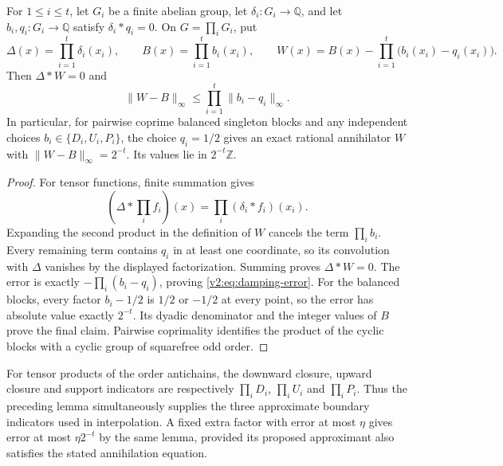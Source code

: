 \begin{lemma}\label{v2:lem:tensor-damping}
For $1\le i\le t$, let $G_i$ be a finite abelian group, let
$\delta_i:G_i\to\mathbb Q$, and let $b_i,q_i:G_i\to\mathbb Q$ satisfy
$\delta_i*q_i=0$.  On $G=\prod_iG_i$, put
\[
 \Delta(x)=\prod_{i=1}^t\delta_i(x_i),\qquad
 B(x)=\prod_{i=1}^tb_i(x_i),\qquad
 W(x)=B(x)-\prod_{i=1}^t\bigl(b_i(x_i)-q_i(x_i)\bigr).
\]
Then $\Delta*W=0$ and
\begin{equation}\label{v2:eq:damping-error}
 \|W-B\|_\infty\le
       \prod_{i=1}^t\|b_i-q_i\|_\infty.
\end{equation}
In particular, for pairwise coprime balanced singleton blocks and any
independent choices $b_i\in\{D_i,U_i,P_i\}$, the choice $q_i=1/2$ gives
an exact rational annihilator $W$ with
$\|W-B\|_\infty=2^{-t}$.  Its values lie in $2^{-t}\mathbb Z$.
\end{lemma}
\begin{proof}
For tensor functions, finite summation gives
\[
 (\Delta*\textstyle\prod_i f_i)(x)
      =\prod_i(\delta_i*f_i)(x_i).
\]
Expanding the second product in the definition of $W$ cancels the term
$\prod_i b_i$.  Every remaining term contains $q_i$ in at least one
coordinate, so its convolution with $\Delta$ vanishes by the displayed
factorization.  Summing proves $\Delta*W=0$.  The error is exactly
$-\prod_i(b_i-q_i)$, proving \eqref{v2:eq:damping-error}.
For the balanced blocks, every factor $b_i-1/2$ is $1/2$ or $-1/2$ at
every point, so the error has absolute value exactly $2^{-t}$.
Its dyadic denominator and the integer values of $B$ prove the final
claim.  Pairwise coprimality identifies the product of the cyclic blocks
with a cyclic group of squarefree odd order.
\end{proof}

For tensor products of the order antichains, the downward closure,
upward closure and support indicators are respectively
$\prod_iD_i$, $\prod_iU_i$ and $\prod_iP_i$.  Thus the preceding lemma
simultaneously supplies the three approximate boundary indicators used
in interpolation.  A fixed extra factor with error at most $\eta$ gives
error at most $\eta2^{-t}$ by the same lemma, provided its proposed
approximant also satisfies the stated annihilation equation.

